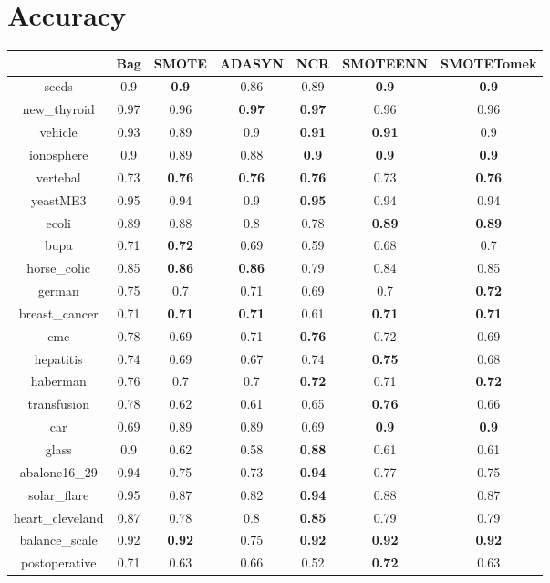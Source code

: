 \documentclass{article}%
\begin{document}
%
\normalsize%
\section*{Accuracy}%
\begin{tabular}{c|cccccc}%
&Bag&SMOTE&ADASYN&NCR&SMOTEENN&SMOTETomek\\%
\hline%
seeds&0.9&\textbf{0.9}&0.86&0.89&\textbf{0.9}&\textbf{0.9}\\%
new\_thyroid&0.97&0.96&\textbf{0.97}&\textbf{0.97}&0.96&0.96\\%
vehicle&0.93&0.89&0.9&\textbf{0.91}&\textbf{0.91}&0.9\\%
ionosphere&0.9&0.89&0.88&\textbf{0.9}&\textbf{0.9}&\textbf{0.9}\\%
vertebal&0.73&\textbf{0.76}&\textbf{0.76}&\textbf{0.76}&0.73&\textbf{0.76}\\%
yeastME3&0.95&0.94&0.9&\textbf{0.95}&0.94&0.94\\%
ecoli&0.89&0.88&0.8&0.78&\textbf{0.89}&\textbf{0.89}\\%
bupa&0.71&\textbf{0.72}&0.69&0.59&0.68&0.7\\%
horse\_colic&0.85&\textbf{0.86}&\textbf{0.86}&0.79&0.84&0.85\\%
german&0.75&0.7&0.71&0.69&0.7&\textbf{0.72}\\%
breast\_cancer&0.71&\textbf{0.71}&\textbf{0.71}&0.61&\textbf{0.71}&\textbf{0.71}\\%
cmc&0.78&0.69&0.71&\textbf{0.76}&0.72&0.69\\%
hepatitis&0.74&0.69&0.67&0.74&\textbf{0.75}&0.68\\%
haberman&0.76&0.7&0.7&\textbf{0.72}&0.71&\textbf{0.72}\\%
transfusion&0.78&0.62&0.61&0.65&\textbf{0.76}&0.66\\%
car&0.69&0.89&0.89&0.69&\textbf{0.9}&\textbf{0.9}\\%
glass&0.9&0.62&0.58&\textbf{0.88}&0.61&0.61\\%
abalone16\_29&0.94&0.75&0.73&\textbf{0.94}&0.77&0.75\\%
solar\_flare&0.95&0.87&0.82&\textbf{0.94}&0.88&0.87\\%
heart\_cleveland&0.87&0.78&0.8&\textbf{0.85}&0.79&0.79\\%
balance\_scale&0.92&\textbf{0.92}&0.75&\textbf{0.92}&\textbf{0.92}&\textbf{0.92}\\%
postoperative&0.71&0.63&0.66&0.52&\textbf{0.72}&0.63\\%
\end{tabular}
\end{document}
